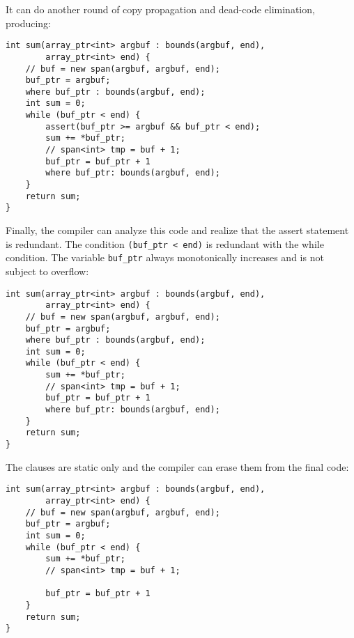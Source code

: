 It can do another round of copy propagation and dead-code elimination,
producing:

\begin{lstlisting}
int sum(array_ptr<int> argbuf : bounds(argbuf, end), 
        array_ptr<int> end) {
    // buf = new span(argbuf, argbuf, end);
    buf_ptr = argbuf;
    where buf_ptr : bounds(argbuf, end);
    int sum = 0;
    while (buf_ptr < end) {
        assert(buf_ptr >= argbuf && buf_ptr < end);
        sum += *buf_ptr;
        // span<int> tmp = buf + 1;
        buf_ptr = buf_ptr + 1
        where buf_ptr: bounds(argbuf, end);
    }
    return sum;
}
\end{lstlisting}

Finally, the compiler can analyze this code and realize that the assert
statement is redundant. The condition \texttt{(buf\_ptr \textless{}
end)} is redundant with the while condition. The variable
\texttt{buf\_ptr} always monotonically increases and is not subject to
overflow:
\begin{lstlisting}
int sum(array_ptr<int> argbuf : bounds(argbuf, end), 
        array_ptr<int> end) {
    // buf = new span(argbuf, argbuf, end);
    buf_ptr = argbuf;
    where buf_ptr : bounds(argbuf, end);
    int sum = 0;
    while (buf_ptr < end) {
        sum += *buf_ptr;
        // span<int> tmp = buf + 1;
        buf_ptr = buf_ptr + 1
        where buf_ptr: bounds(argbuf, end);
    }
    return sum;
}
\end{lstlisting}

The  clauses are static only and the compiler can erase
them from the final code:

\begin{lstlisting}
int sum(array_ptr<int> argbuf : bounds(argbuf, end), 
        array_ptr<int> end) {
    // buf = new span(argbuf, argbuf, end);
    buf_ptr = argbuf;
    int sum = 0;
    while (buf_ptr < end) {
        sum += *buf_ptr;
        // span<int> tmp = buf + 1;

        buf_ptr = buf_ptr + 1
    }
    return sum;
}
\end{lstlisting}